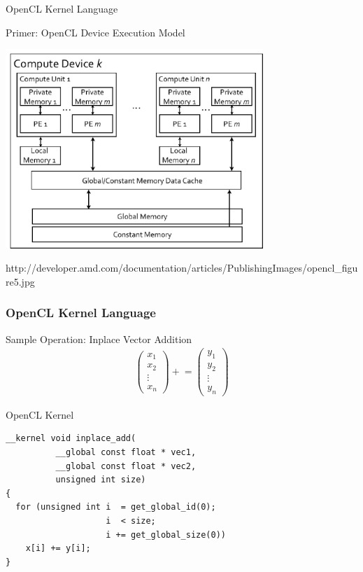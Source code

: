 

\begin{frame}{OpenCL Kernel Language}

\begin{block}{Primer: OpenCL Device Execution Model}
 \begin{center}
   \includegraphics[width=0.73\textwidth]{figures/opencl-device.jpg} \\
 \end{center}
  {\tiny http://developer.amd.com/documentation/articles/PublishingImages/opencl\_figure5.jpg}
  \vspace{0.5cm}
\end{block}

\end{frame}




\begin{frame}[fragile]
\frametitle{OpenCL Kernel Language}

\begin{block}{Sample Operation: Inplace Vector Addition}
 \vspace*{-0.5cm}
 \begin{align*}
  \left(
  \begin{array}{c}
   x_1 \\
   x_2 \\
   \vdots \\
   x_n 
  \end{array} \right) +\!= 
  \left(
  \begin{array}{c}
   y_1 \\
   y_2 \\
   \vdots \\
   y_n 
  \end{array} \right)
 \end{align*}
\end{block}

 \vspace*{-0.3cm}
\begin{block}{OpenCL Kernel}
\begin{lstlisting}
__kernel void inplace_add(
          __global const float * vec1,
          __global const float * vec2,
          unsigned int size) 
{ 
  for (unsigned int i  = get_global_id(0); 
                    i  < size; 
                    i += get_global_size(0))
    x[i] += y[i];
}
\end{lstlisting}
\end{block}
\end{frame}




